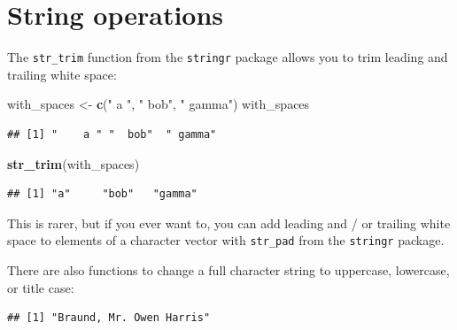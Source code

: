 \documentclass[]{book}
\makeatletter
\newenvironment{Shaded}{\begin{snugshade}}{\end{snugshade}}
\newcommand{\KeywordTok}[1]{\textcolor[rgb]{0.13,0.29,0.53}{\textbf{{#1}}}}
\newcommand{\DecValTok}[1]{\textcolor[rgb]{0.00,0.00,0.81}{{#1}}}
\newcommand{\StringTok}[1]{\textcolor[rgb]{0.31,0.60,0.02}{{#1}}}
\newcommand{\NormalTok}[1]{{#1}}
\newenvironment{kframe}{%
\medskip{}
\setlength{\fboxsep}{.8em}
 \def\at@end@of@kframe{}%
 \ifinner\ifhmode%
  \def\at@end@of@kframe{\end{minipage}}%
  \begin{minipage}{\columnwidth}%
 \fi\fi%
 \def\FrameCommand##1{\hskip\@totalleftmargin \hskip-\fboxsep
 \colorbox{shadecolor}{##1}\hskip-\fboxsep
     \hskip-\linewidth \hskip-\@totalleftmargin \hskip\columnwidth}%
 \MakeFramed {\advance\hsize-\width
   \@totalleftmargin\z@ \linewidth\hsize
   \@setminipage}}%
 {\par\unskip\endMakeFramed%
 \at@end@of@kframe}
\renewenvironment{Shaded}{\begin{kframe}}{\end{kframe}}
\makeatother
\begin{document}
\section{String operations}\label{string-operations}

The \texttt{str\_trim} function from the \texttt{stringr} package allows
you to trim leading and trailing white space:

\begin{Shaded}
\begin{Highlighting}[]
\NormalTok{with_spaces <-}\StringTok{ }\KeywordTok{c}\NormalTok{(}\StringTok{"    a "}\NormalTok{, }\StringTok{"  bob"}\NormalTok{, }\StringTok{" gamma"}\NormalTok{)}
\NormalTok{with_spaces}
\end{Highlighting}
\end{Shaded}

\begin{verbatim}
## [1] "    a " "  bob"  " gamma"
\end{verbatim}

\begin{Shaded}
\begin{Highlighting}[]
\KeywordTok{str_trim}\NormalTok{(with_spaces)}
\end{Highlighting}
\end{Shaded}

\begin{verbatim}
## [1] "a"     "bob"   "gamma"
\end{verbatim}

This is rarer, but if you ever want to, you can add leading and / or
trailing white space to elements of a character vector with
\texttt{str\_pad} from the \texttt{stringr} package.

There are also functions to change a full character string to uppercase,
lowercase, or title case:

\begin{Shaded}
\end{Shaded}

\begin{verbatim}
## [1] "Braund, Mr. Owen Harris"
\end{verbatim}

\begin{Shaded}
\end{Shaded}
\end{document}
